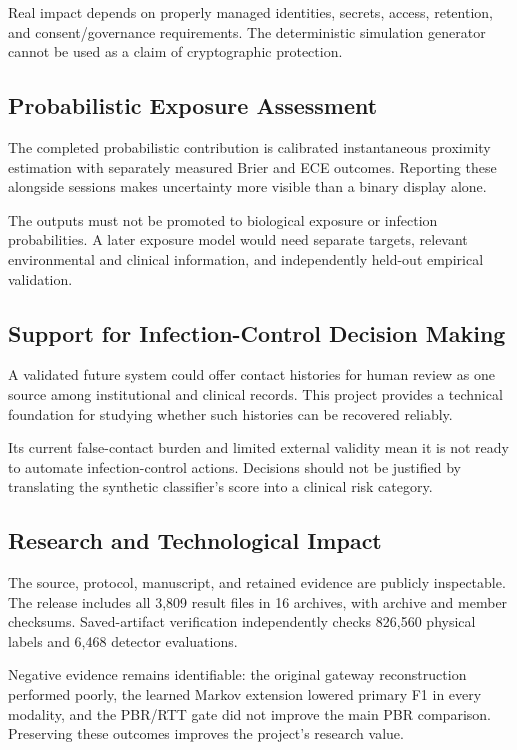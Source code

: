 \documentclass[12pt,a4paper]{report}
\begin{document}
Real impact depends on properly managed identities, secrets, access, retention, and consent/governance requirements. The deterministic simulation generator cannot be used as a claim of cryptographic protection.

\subsection{Probabilistic Exposure Assessment}
The completed probabilistic contribution is calibrated instantaneous proximity estimation with separately measured Brier and ECE outcomes. Reporting these alongside sessions makes uncertainty more visible than a binary display alone.

The outputs must not be promoted to biological exposure or infection probabilities. A later exposure model would need separate targets, relevant environmental and clinical information, and independently held-out empirical validation.

\subsection{Support for Infection-Control Decision Making}
A validated future system could offer contact histories for human review as one source among institutional and clinical records. This project provides a technical foundation for studying whether such histories can be recovered reliably.

Its current false-contact burden and limited external validity mean it is not ready to automate infection-control actions. Decisions should not be justified by translating the synthetic classifier's score into a clinical risk category.

\subsection{Research and Technological Impact}
The source, protocol, manuscript, and retained evidence are publicly inspectable. The release includes all 3,809 result files in 16 archives, with archive and member checksums. Saved-artifact verification independently checks 826,560 physical labels and 6,468 detector evaluations.

Negative evidence remains identifiable: the original gateway reconstruction performed poorly, the learned Markov extension lowered primary F1 in every modality, and the PBR/RTT gate did not improve the main PBR comparison. Preserving these outcomes improves the project's research value.
\end{document}
